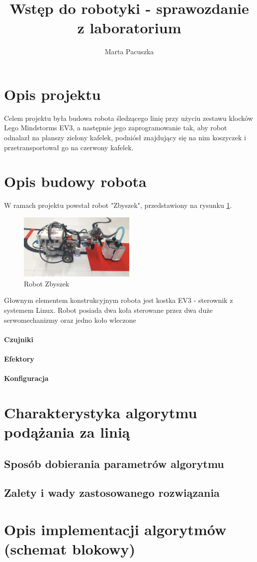 \documentclass{article}
\title{Wstęp do robotyki - sprawozdanie z laboratorium}
\author{Marta Pacuszka}
\begin{document}
\maketitle
\newpage
{}
\section{Opis projektu}
Celem projektu była budowa robota śledzącego linię przy użyciu zestawu klocków Lego Mindstorms EV3, a następnie jego zaprogramowanie tak, aby robot odnalazł na planszy zielony kafelek, podniósł znajdujący się na nim koszyczek i przetransportował go na czerwony kafelek.
\section{Opis budowy robota}
W ramach projektu powstał robot "Zbyszek", przedstawiony na rysunku \ref{zbyszek}. 
\begin{figure}[h]
\centering
\includegraphics[width=0.5\textwidth]{zbyszek.jpg}
\caption{Robot Zbyszek}
\label{zbyszek}
\end{figure}
Głownym elementem konstrukcyjnym robota jest kostka EV3 - sterownik z systemem Linux. Robot posiada dwa koła sterowane przez dwa duże serwomechanizmy oraz jedno koło wleczone
\paragraph{Czujniki}
\paragraph{Efektory}
\paragraph{Konfiguracja}
\section{Charakterystyka algorytmu podążania za linią}
\subsection{Sposób dobierania parametrów algorytmu}
\subsection{Zalety i wady zastosowanego rozwiązania}
\section{Opis implementacji algorytmów (schemat blokowy)}
\end{document}
